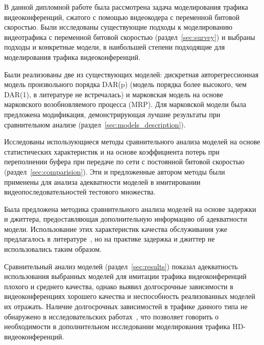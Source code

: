 
В данной дипломной работе была рассмотрена задача моделирования трафика видеоконференций,
сжатого с помощью видеокодера с переменной битовой скоростью.
Были исследованы существующие подходы к моделированию видеотрафика с переменной
битовой скоростью (раздел~\ref{sec:survey}) и выбраны подходы и конкретные модели, в наибольшей степени
подходящие для моделирования трафика видеоконференций.

Были реализованы две из существующих моделей: дискретная авторегрессионная модель
произвольного порядка DAR(p) (модель порядка более высокого, чем DAR(1), в литературе
не встречалась) и марковская модель на основе марковского возобновляемого процесса
(MRP). Для марковской модели была предложена модификация,
демонстрирующая лучшие результаты при сравнительном анализе (раздел~\ref{sec:models_description}).

Исследованы использующиеся методы сравнительного анализа моделей на основе
статистических характеристик и на основе коэффициента потерь при
переполнении буфера при передаче по сети с постоянной битовой
скоростью (раздел~\ref{sec:comparision}). Эти и предложенные автором методы были применены для анализа
адекватности моделей в имитировании видеопоследовательностей тестового
множества.

Была предложена методика сравнительного анализа моделей на основе
задержки и джиттера, предоставляющая дополнительную информацию
об адекватности модели. Использование этих характеристик
качества обслуживания уже предлагалось в литературе~\cite{survey2013}, но
на практике задержка и джиттер не использовались таким образом.

Сравнительный анализ моделей (раздел~\ref{sec:results}) показал адекватность использования
выбранных моделей для имитации трафика видеоконференций плохого
и среднего качества, однако выявил долгосрочные зависимости в видеоконференциях
хорошего качества и неспособность реализованных моделей их
отражать. Наличие долгосрочных зависимостей в трафике данного типа
не обнаружено в исследовательских работах~\cite{survey2013, ars2004, characteristics2013},
что позволяет говорить о необходимости в дополнительном исследовании
моделирования трафика HD-видеоконференций.
